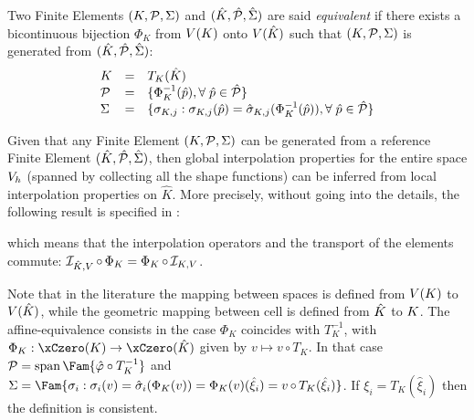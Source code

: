 \begin{dfntn}
Two Finite Elements ${({K},{\mathcal P}, {\Sigma})}$ and ${({\hat {{K}}},{\hat {{\mathcal P}}}, {\hat{{\Sigma}}})}$ are said \textit{equivalent} if there exists a bicontinuous bijection $\Phi_K$ from ${V}({K})$ onto ${V}({\hat {{K}}})$ such that ${({K},{\mathcal P}, {\Sigma})}$ is generated from ${({\hat {{K}}},{\hat {{\mathcal P}}}, {\hat{{\Sigma}}})}$:
\begin{equation*}
\begin{array}{lcl}
K       &=& T_K(\hat K)\\
{\mathcal P} &=& \lbrace \Phi_K^{-1}(\hat p), {\forall\;} \hat p \in {\hat {{\mathcal P}}} \rbrace\\
\Sigma  &=& \lbrace \sigma_{K,j} : \sigma_{K,j}(\hat p) = \hat\sigma_{K,j}(\Phi_K^{-1}(\hat p)), {\forall\;} \hat p \in {\hat {{\mathcal P}}} \rbrace
\end{array}
\end{equation*}
\end{dfntn}

Given that any Finite Element ${({K},{\mathcal P}, {\Sigma})}$ can be generated from a reference Finite Element ${({\hat {{K}}},{\hat {{\mathcal P}}}, {\hat{{\Sigma}}})}$, then global interpolation properties for the entire space ${{V}}_h$ (spanned by collecting all the shape functions) can be inferred from local interpolation properties on $\hat K$. More precisely, without going into the details, the following result is specified in \cite{EG}:
\begin{center}
\end{center}
which means that the interpolation operators and the transport of the elements commute: $\mathop{\mathcal{I}_{{\hat {{K}}},{V}}}\mathop{\circ}\Phi_K = \Phi_K\mathop{\circ} \mathop{\mathcal{I}_{K,{V}}}$.

\begin{rmrk}
Note that in the literature the mapping between spaces is defined from ${V}({K})$ to ${V}({\hat {{K}}})$, while the geometric mapping between cell is defined from ${\hat {{K}}}$ to ${K}$. The affine-equivalence consists in the case $\Phi_K$ coincides with $T_K^{-1}$, with $\Phi_K: \xCzero(K) \rightarrow \xCzero(\hat K)$ given by $v \mapsto v\mathop{\circ}T_K$. In that case $\SpaceP = \Span\Fam{ \hat\varphi\circ T_K^{-1} }$ and $\Sigma = \Fam{\sigma_i : \sigma_i(v) = \hat\sigma_i(\Phi_K(v)) = \Phi_K(v)(\hat\xi_i) = v\mathop{\circ} T_K(\hat\xi_i)}$.
If $\xi_i = T_K(\hat\xi_i)$ then the definition is consistent.
\end{rmrk}



